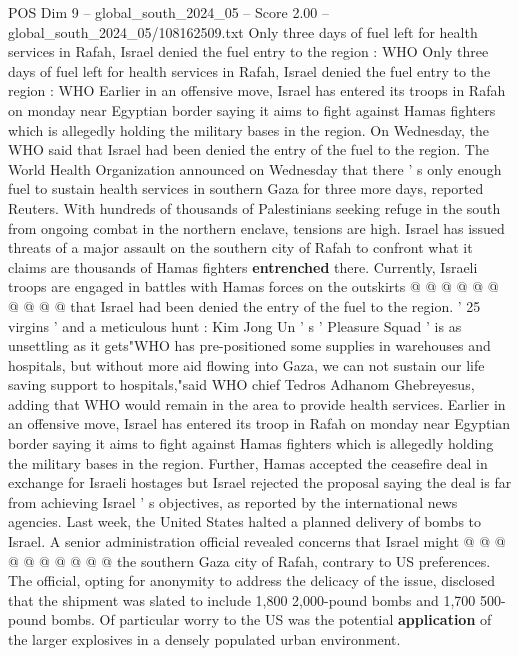 \begin{textsample}{POS Dim 9 – global\_south\_2024\_05 – Score 2.00 – global\_south\_2024\_05/108162509.txt}  \label{ex:f9_pos_035}
Only three days of fuel left for health services in Rafah, Israel denied the fuel entry to the region : WHO Only three days of fuel left for health services in Rafah, Israel denied the fuel entry to the region : WHO Earlier in an offensive move, Israel has entered its troops in Rafah on monday near Egyptian border saying it aims to fight against Hamas fighters which is allegedly holding the military bases in the region.
On Wednesday, the WHO said that Israel had been denied the entry of the fuel to the region.
The World Health Organization announced on Wednesday that there ' s only enough fuel to sustain health services in southern Gaza for three more days, reported Reuters.
With hundreds of thousands of Palestinians seeking refuge in the south from ongoing combat in the northern enclave, tensions are high.
Israel has issued threats of a major assault on the southern city of Rafah to confront what it claims are thousands of Hamas fighters \textbf{entrenched} there.
Currently, Israeli troops are engaged in battles with Hamas forces on the outskirts @ @ @ @ @ @ @ @ @ @ that Israel had been denied the entry of the fuel to the region. ' 25 virgins ' and a meticulous hunt : Kim Jong Un ' s ' Pleasure Squad ' is as unsettling as it gets"WHO has pre-positioned some supplies in warehouses and hospitals, but without more aid flowing into Gaza, we can not sustain our life saving support to hospitals,"said WHO chief Tedros Adhanom Ghebreyesus, adding that WHO would remain in the area to provide health services.
Earlier in an offensive move, Israel has entered its troop in Rafah on monday near Egyptian border saying it aims to fight against Hamas fighters which is allegedly holding the military bases in the region.
Further, Hamas accepted the ceasefire deal in exchange for Israeli hostages but Israel rejected the proposal saying the deal is far from achieving Israel ' s objectives, as reported by the international news agencies.
Last week, the United States halted a planned delivery of bombs to Israel.
A senior administration official revealed concerns that Israel might @ @ @ @ @ @ @ @ @ @ the southern Gaza city of Rafah, contrary to US preferences.
The official, opting for anonymity to address the delicacy of the issue, disclosed that the shipment was slated to include 1,800 2,000-pound bombs and 1,700 500-pound bombs.
Of particular worry to the US was the potential \textbf{application} of the larger explosives in a densely populated urban environment.

\end{textsample}
